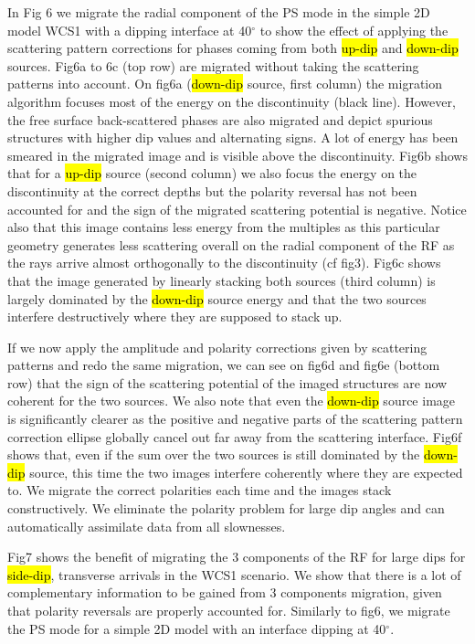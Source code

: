 \documentclass[9pt,a4paper]{article}
\numberwithin{equation}{section}
\begin{document}
\begin{multicols}{2}
In Fig 6 we migrate the radial component of the PS mode in the simple 2D model WCS1 with a dipping interface at 40$^{\circ}$ to show the effect of applying the scattering pattern corrections for phases coming from both \hl{up-dip} and \hl{down-dip} sources.
Fig6a to 6c (top row) are migrated without taking the scattering patterns into account.
On fig6a (\hl{down-dip} source, first column) the migration algorithm focuses most of the energy on the discontinuity (black line).
However, the free surface back-scattered phases are also migrated and depict spurious structures with higher dip values and alternating signs.
A lot of energy has been smeared in the migrated image and is visible above the discontinuity.
Fig6b shows that for a \hl{up-dip} source (second column) we also focus the energy on the discontinuity at the correct depths but the polarity reversal has not been accounted for and the sign of the migrated scattering potential is negative.
Notice also that this image contains less energy from the multiples as this particular geometry generates less scattering overall on the radial component of the RF as the rays arrive almost orthogonally to the discontinuity (cf fig3).
Fig6c shows that the image generated by linearly stacking both sources (third column) is largely dominated by the \hl{down-dip} source energy and that the two sources interfere destructively where they are supposed to stack up.

If we now apply the amplitude and polarity corrections given by scattering patterns and redo the same migration, we can see on fig6d and fig6e (bottom row) that the sign of the scattering potential of the imaged structures are now coherent for the two sources.
We also note that even the \hl{down-dip} source image is significantly clearer as the positive and negative parts of the scattering pattern correction ellipse globally cancel out far away from the scattering interface.
Fig6f shows that, even if the sum over the two sources is still dominated by the \hl{down-dip} source, this time the two images interfere coherently where they are expected to.
We migrate the correct polarities each time and the images stack constructively.
We eliminate the polarity problem for large dip angles and can automatically assimilate data from all slownesses.

Fig7 shows the benefit of migrating the 3 components of the RF for large dips for \hl{side-dip}, transverse arrivals in the WCS1 scenario.
We show that there is a lot of complementary information to be gained from 3 components migration, given that polarity reversals are properly accounted for.
Similarly to fig6, we migrate the PS mode for a simple 2D model with an interface dipping at 40$^{\circ}$.


\end{multicols}
\end{document}
